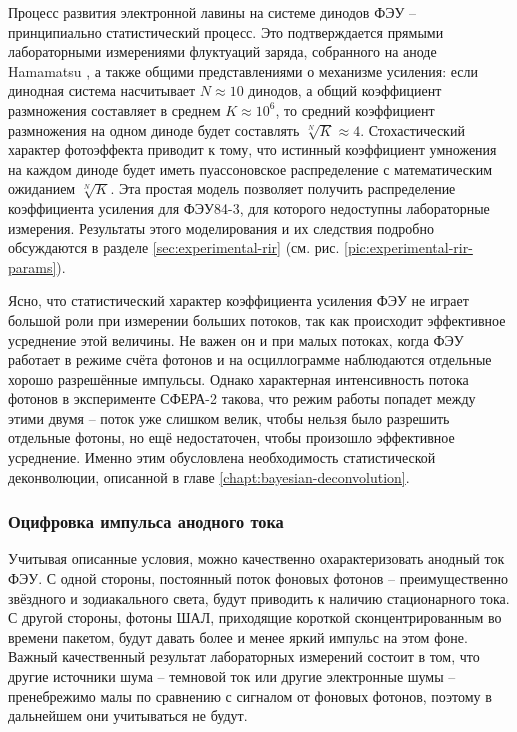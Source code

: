 Процесс развития электронной лавины на системе динодов ФЭУ -- принципиально статистический процесс. Это подтверждается прямыми лабораторными измерениями флуктуаций заряда, собранного на аноде Hamamatsu \cite[рис. 9]{SphereCalibration2016}, а также общими представлениями о механизме усиления: если динодная система насчитывает $N \approx 10$ динодов, а общий коэффициент размножения составляет в среднем $K \approx 10^6$, то средний коэффициент размножения на одном диноде будет составлять $\sqrt[N]{K} \approx 4$. Стохастический характер фотоэффекта приводит к тому, что истинный коэффициент умножения на каждом диноде будет иметь пуассоновское распределение с математическим ожиданием $\sqrt[N]{K}$. Эта простая модель позволяет получить распределение коэффициента усиления для ФЭУ84-3, для которого недоступны лабораторные измерения. Результаты этого моделирования и их следствия подробно обсуждаются в разделе \ref{sec:experimental-rir} (см. рис. \ref{pic:experimental-rir-params}).

Ясно, что статистический характер коэффициента усиления ФЭУ не играет большой роли при измерении больших потоков, так как происходит эффективное усреднение этой величины. Не важен он и при малых потоках, когда ФЭУ работает в режиме счёта фотонов и на осциллограмме наблюдаются отдельные хорошо разрешённые импульсы. Однако характерная интенсивность потока фотонов в эксперименте СФЕРА-2 такова, что режим работы попадет между этими двумя -- поток уже слишком велик, чтобы нельзя было разрешить отдельные фотоны, но ещё недостаточен, чтобы произошло эффективное усреднение. Именно этим обусловлена необходимость статистической деконволюции, описанной в главе \ref{chapt:bayesian-deconvolution}.

\subsubsection{Оцифровка импульса анодного тока}

Учитывая описанные условия, можно качественно охарактеризовать анодный ток ФЭУ. С одной стороны, постоянный поток фоновых фотонов -- преимущественно звёздного и зодиакального света, будут приводить к наличию стационарного тока. С другой стороны, фотоны ШАЛ, приходящие короткой сконцентрированным во времени пакетом, будут давать более и менее яркий импульс на этом фоне. Важный качественный результат лабораторных измерений состоит в том, что другие источники шума -- темновой ток или другие электронные шумы -- пренебрежимо малы по сравнению с сигналом от фоновых фотонов, поэтому в дальнейшем они учитываться не будут.

